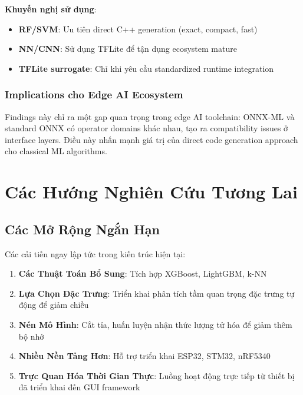\textbf{Khuyến nghị sử dụng}: 
\begin{itemize}
    \item \textbf{RF/SVM}: Ưu tiên direct C++ generation (exact, compact, fast)
    \item \textbf{NN/CNN}: Sử dụng TFLite để tận dụng ecosystem mature
    \item \textbf{TFLite surrogate}: Chỉ khi yêu cầu standardized runtime integration
\end{itemize}

\subsubsection{Implications cho Edge AI Ecosystem}
Findings này chỉ ra một gap quan trọng trong edge AI toolchain: ONNX-ML và standard ONNX có operator domains khác nhau, tạo ra compatibility issues ở interface layers. Điều này nhấn mạnh giá trị của direct code generation approach cho classical ML algorithms.

\section{Các Hướng Nghiên Cứu Tương Lai}

\subsection{Các Mở Rộng Ngắn Hạn}
Các cải tiến ngay lập tức trong kiến trúc hiện tại:
\begin{enumerate}
    \item \textbf{Các Thuật Toán Bổ Sung}: Tích hợp XGBoost, LightGBM, k-NN
    \item \textbf{Lựa Chọn Đặc Trưng}: Triển khai phân tích tầm quan trọng đặc trưng tự động để giảm chiều
    \item \textbf{Nén Mô Hình}: Cắt tỉa, huấn luyện nhận thức lượng tử hóa để giảm thêm bộ nhớ
    \item \textbf{Nhiều Nền Tảng Hơn}: Hỗ trợ triển khai ESP32, STM32, nRF5340
    \item \textbf{Trực Quan Hóa Thời Gian Thực}: Luồng hoạt động trực tiếp từ thiết bị đã triển khai đến GUI framework
\end{enumerate}

